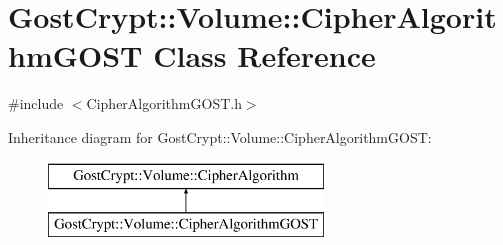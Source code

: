 \hypertarget{class_gost_crypt_1_1_volume_1_1_cipher_algorithm_g_o_s_t}{}\section{Gost\+Crypt\+:\+:Volume\+:\+:Cipher\+Algorithm\+G\+O\+ST Class Reference}
\label{class_gost_crypt_1_1_volume_1_1_cipher_algorithm_g_o_s_t}


{\ttfamily \#include $<$Cipher\+Algorithm\+G\+O\+S\+T.\+h$>$}

Inheritance diagram for Gost\+Crypt\+:\+:Volume\+:\+:Cipher\+Algorithm\+G\+O\+ST\+:\begin{figure}[H]
\begin{center}
\leavevmode
\includegraphics[height=2.000000cm]{class_gost_crypt_1_1_volume_1_1_cipher_algorithm_g_o_s_t}
\end{center}
\end{figure}

